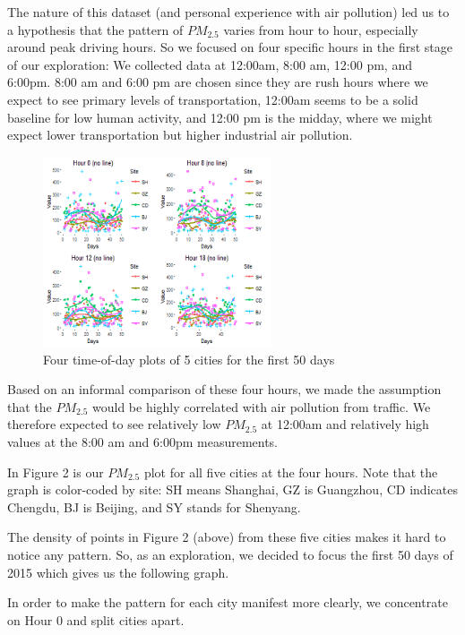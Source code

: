 \documentclass[11pt]{article} %
\begin{document}
	The nature of this dataset (and personal experience with air pollution) led us to a hypothesis that the pattern of \(PM_{2.5}\) varies from hour to hour, especially around peak driving hours. So we focused on four specific hours in the first stage of our exploration: We collected data at 12:00am, 8:00 am, 12:00 pm, and 6:00pm. 8:00 am and 6:00 pm are chosen since they are rush hours where we expect to see primary levels of transportation, 12:00am seems to be a solid baseline for low human activity, and 12:00 pm is the midday, where we might expect lower transportation but higher industrial air pollution.
	
\begin{figure}[!ht]
  \centering
    \includegraphics[width=0.6\textwidth]{Figure1-2}
      \caption{Four time-of-day plots of 5 cities for the first 50 days}
\end{figure}

	Based on an informal comparison of these four hours, we made the assumption that the \(PM_{2.5}\) would be highly correlated with air pollution from traffic. We therefore expected to see relatively low \(PM_{2.5}\) at 12:00am and relatively high values at the 8:00 am and 6:00pm measurements.

	In Figure 2 is our  \(PM_{2.5}\) plot for all five cities at the four hours. Note that the graph is color-coded by site: SH means Shanghai, GZ is Guangzhou, CD indicates Chengdu, BJ is Beijing, and SY stands for Shenyang. 
	


	The density of points in Figure 2 (above) from these five cities makes it hard to notice any pattern. So, as an exploration, we decided to focus the first 50 days of 2015 which gives us the following graph.
	


In order to make the pattern for each city manifest more clearly, we concentrate on Hour 0 and split cities apart. 
\end{document}
